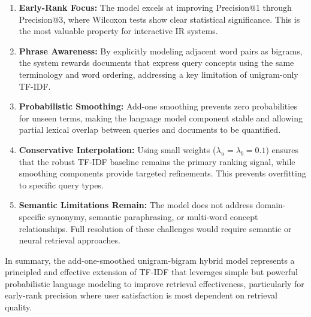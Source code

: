 \begin{enumerate}
    \item \textbf{Early-Rank Focus:} The model excels at improving Precision@1 through Precision@3, where Wilcoxon tests show clear statistical significance. This is the most valuable property for interactive IR systems.
    
    \item \textbf{Phrase Awareness:} By explicitly modeling adjacent word pairs as bigrams, the system rewards documents that express query concepts using the same terminology and word ordering, addressing a key limitation of unigram-only TF-IDF.
    
    \item \textbf{Probabilistic Smoothing:} Add-one smoothing prevents zero probabilities for unseen terms, making the language model component stable and allowing partial lexical overlap between queries and documents to be quantified.
    
    \item \textbf{Conservative Interpolation:} Using small weights ($\lambda_u = \lambda_b = 0.1$) ensures that the robust TF-IDF baseline remains the primary ranking signal, while smoothing components provide targeted refinements. This prevents overfitting to specific query types.
    
    \item \textbf{Semantic Limitations Remain:} The model does not address domain-specific synonymy, semantic paraphrasing, or multi-word concept relationships. Full resolution of these challenges would require semantic or neural retrieval approaches.
\end{enumerate}

In summary, the add-one-smoothed unigram-bigram hybrid model represents a principled and effective extension of TF-IDF that leverages simple but powerful probabilistic language modeling to improve retrieval effectiveness, particularly for early-rank precision where user satisfaction is most dependent on retrieval quality.
